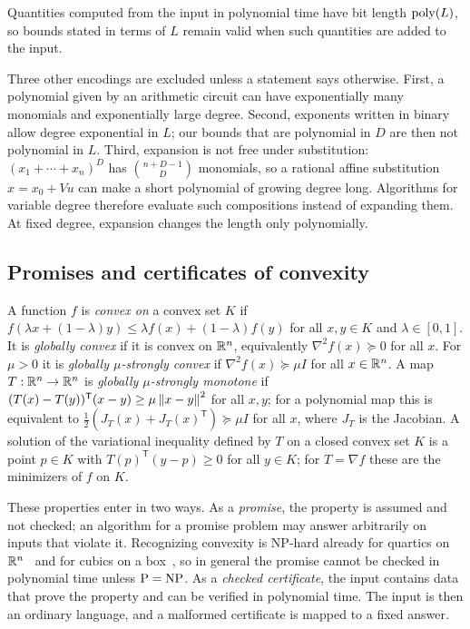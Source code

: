 Quantities computed from the input in polynomial time have bit length
$\operatorname{poly}(L)$, so bounds stated in terms of $L$ remain valid when such
quantities are added to the input.

\begin{remark}
\label{rem:models-encodings}
Three other encodings are excluded unless a statement says otherwise. First,
a polynomial given by an arithmetic circuit can have exponentially many
monomials and exponentially large degree. Second, exponents written in binary
allow degree exponential in $L$; our bounds that are polynomial in $D$ are
then not polynomial in $L$. Third, expansion is not free under substitution:
$(x_1+\cdots+x_n)^D$ has $\binom{n+D-1}{D}$ monomials, so a rational affine
substitution $x=x_0+Vu$ can make a short polynomial of growing degree long.
Algorithms for variable degree therefore evaluate such compositions instead of
expanding them. At fixed degree, expansion changes the length only
polynomially.
\end{remark}

\subsection{Promises and certificates of convexity}
\label{sec:models-promises}

A function $f$ is \emph{convex on} a convex set $K$ if
$f(\lambda x+(1-\lambda)y)\le\lambda f(x)+(1-\lambda)f(y)$ for all $x,y\in K$
and $\lambda\in[0,1]$. It is \emph{globally convex} if it is convex on $\mathbb R^n$,
equivalently $\nabla^2f(x)\succeq0$ for all $x$. For $\mu>0$ it is
\emph{globally $\mu$-strongly convex} if $\nabla^2f(x)\succeq\mu I$ for all
$x\in\mathbb R^n$. A map $T:\mathbb R^n\to\mathbb R^n$ is \emph{globally $\mu$-strongly monotone}
if $(T(x)-T(y))^{\mathsf T}(x-y)\ge\mu\left\lVert x-y\right\rVert^2$ for all $x,y$; for a
polynomial map this is equivalent to
$\frac12(J_T(x)+J_T(x)^{\mathsf T})\succeq\mu I$ for all $x$, where $J_T$ is
the Jacobian. A solution of the variational inequality defined by $T$ on a
closed convex set $K$ is a point $p\in K$ with
$T(p)^{\mathsf T}(y-p)\ge0$ for all $y\in K$; for $T=\nabla f$ these are the
minimizers of $f$ on $K$.

These properties enter in two ways. As a \emph{promise}, the property is
assumed and not checked; an algorithm for a promise problem may answer
arbitrarily on inputs that violate it. Recognizing convexity is NP-hard
already for quartics on $\mathbb R^n$~\cite{AhmadiOlshevskyParriloTsitsiklis2013}
and for cubics on a box~\cite{AhmadiHall2020}, so in general the promise
cannot be checked in polynomial time unless $\mathrm P=\mathrm{NP}$. As a
\emph{checked certificate}, the input contains data
that prove the property and can be verified in polynomial time. The input is
then an ordinary language, and a malformed certificate is mapped to a fixed
answer.


